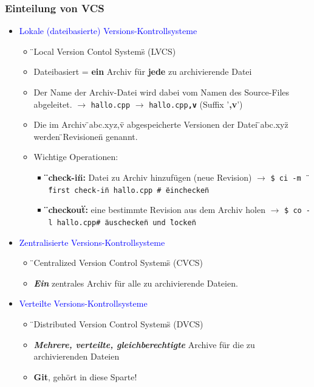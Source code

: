 \subsubsection{Einteilung von VCS}
	\begin{itemize}
\item \textcolor{blue}{Lokale (dateibasierte) Versions-Kontrollsysteme}
\begin{itemize}
\item \"{}Local Version Contol Systems\"{} (LVCS)
 \item Dateibasiert = \textbf{ein} Archiv für \textbf{jede} zu archivierende Datei
 \item Der Name der Archiv-Datei wird dabei vom Namen des Source-Files abgeleitet. \newline $\rightarrow$ \texttt{hallo.cpp} $\rightarrow$ \texttt{hallo.cpp\textbf{,v}} (Suffix '\textbf{,v}') 
 \item Die im Archiv \"{}abc.xyz,v\"{} abgespeicherte Versionen der Datei \"{}abc.xyz\"{} werden \"{}Revisionen\"{} genannt.
 \item Wichtige Operationen:
 \begin{itemize}
 	\item \textbf{\"{}check-in\"{}:} Datei zu Archiv hinzufügen (neue Revision) \newline $\rightarrow$ \texttt{\$ ci -m \"{}first check-in\"{} hallo.cpp \qquad \# \"{}einchecken\"{}}
 	\item \textbf{\"{}checkout\"{}:} eine bestimmte Revision aus dem Archiv holen \newline $\rightarrow$ \texttt{\$ co -l hallo.cpp\qquad \# \"{}auschecken\"{} und \"{}locken\"{}}
 \end{itemize}
\end{itemize}
\item \textcolor{blue}{Zentralisierte Versions-Kontrollsysteme}
\begin{itemize}
	\item \"{}Centralized Version Control Systems\"{} (CVCS)
	\item \textbf{\textit{Ein}} zentrales Archiv für alle zu archivierende Dateien. 
\end{itemize}
\item \textcolor{blue}{Verteilte Versions-Kontrollsysteme}
\begin{itemize}
	\item \"{}Distributed Version Control Systems\"{} (DVCS)
	\item \textbf{\textit{Mehrere, verteilte, gleichberechtigte}} Archive für die zu archivierenden Dateien
	\item \textbf{Git}, gehört in diese Sparte!
\end{itemize}
\end{itemize}
\clearpage
